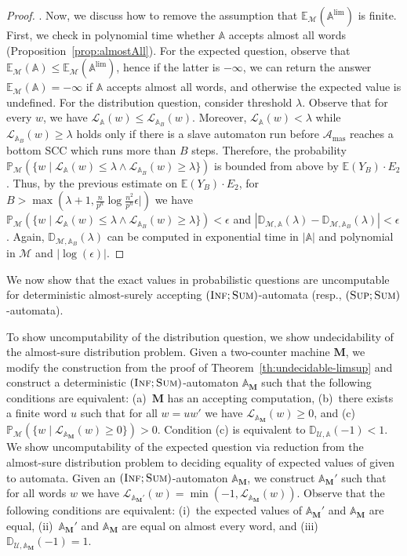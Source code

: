 \documentclass{lmcs}
\newcommand{\proofideas}{\smallskip\noindent{\emph{The key ideas.}}}
\newcommand{\Paragraph}[1]{\noindent{\textbf{#1}}}
\newcommand{\masterA}{\mathcal{A}_{\textrm{mas}}}
\newcommand{\nestedA}{\mathbb{A}}
\newcommand{\valueL}[1]{\mathcal{L}_{{#1}}}
\newcommand{\fsum}{\textsc{Sum}}
\newcommand{\fsup}{\textsc{Sup}}
\newcommand{\finf}{\textsc{Inf}}
\newcommand{\const}{\lambda}
\newcommand{\probability}{\mathbb{P}}
\newcommand{\expected}{\mathbb{E}}
\newcommand{\distrib}{\mathbb{D}}
\newcommand{\markov}{\mathcal{M}}
\newcommand{\calU}{\mathcal{U}}
\newcommand{\M}{\mathbf{M}}
\begin{document}
\begin{proof}
\Paragraph{Lifting the assumption}.
Now, we discuss how to remove the assumption that $\expected_{\markov}(\nestedA^{\lim})$ is finite.
First, we check in polynomial time whether $\nestedA$ accepts almost all words (Proposition~\ref{prop:almostAll}).
For the expected question, observe that $\expected_{\markov}(\nestedA) \leq \expected_{\markov}(\nestedA^{\lim})$, hence
if the latter is $-\infty$, we can return the answer $\expected_{\markov}(\nestedA) = -\infty$ if $\nestedA$ accepts almost all words, and otherwise
the expected value is undefined.
For the distribution question, consider threshold $\const$.
Observe that for every $w$, we have $\valueL{\nestedA}(w) \leq \valueL{\nestedA_B}(w)$.
Moreover, $\valueL{\nestedA}(w) < \const$ while $\valueL{\nestedA_B}(w) \geq \const $ holds only if there is a slave automaton
run before $\masterA$ reaches a bottom SCC which runs more than $B$ steps. Therefore,
the probability $\probability_\markov(\{w \mid \valueL{\nestedA}(w) \leq \const \wedge  \valueL{\nestedA_B}(w) \geq \const \})$ is bounded from above by
$\expected({Y_B}) \cdot E_2$. Thus, by the previous estimate on $\expected({Y_B}) \cdot E_2$,  for
 $B > \max(\const+1, \frac{n}{p^n} \log \frac{n^2}{p^n} \epsilon|)$  we have
$\probability_\markov(\{w \mid \valueL{\nestedA}(w) \leq \const \wedge  \valueL{\nestedA_B}(w) \geq \const \}) < \epsilon$
and $|\distrib_{\markov, \nestedA}(\const) - \distrib_{\markov,\nestedA_B}(\const)| < \epsilon$.
Again, $\distrib_{\markov,\nestedA_B}(\const)$ can be computed in exponential time in $|\nestedA|$ and polynomial in $\markov$ and $|\log(\epsilon)|$.
\end{proof}


We now show that the exact values in probabilistic questions are uncomputable for deterministic almost-surely accepting $(\finf; \fsum)$-automata (resp., $(\fsup; \fsum)$-automata).

\proofideas{}
To show uncomputability of the distribution question, we show undecidability of the almost-sure distribution problem.
Given a two-counter machine $\M$, we modify the construction from the proof of Theorem~\ref{th:undecidable-limsup} and construct
 a deterministic $(\finf; \fsum)$-automaton $\nestedA_{\M}$ such that the following conditions are equivalent:
(a)~$\M$ has an accepting computation,
(b)~there exists a finite word $u$ such that for all $w = uw'$ we have $\valueL{\nestedA_{\M}}(w) \geq 0$, and
(c)~$\probability_{\markov}( \{ w \mid  \valueL{\nestedA_{\M}}(w) \geq 0 \}) > 0$.
Condition (c) is equivalent to $\distrib_{\calU, \nestedA}(-1) < 1$.
We show  uncomputability of the expected question via reduction from the almost-sure distribution problem
to deciding equality of expected values of given to automata.
Given an $(\finf; \fsum)$-automaton $\nestedA_{\M}$, we construct $\nestedA_{\M}'$ such that
for all words $w$ we have $\valueL{\nestedA_{\M}'}(w) = \min(-1, \valueL{\nestedA_{\M}}(w))$.
Observe that the following conditions are equivalent:
(i)~the expected values of $\nestedA_{\M}'$ and $\nestedA_{\M}$ are equal,
(ii)~$\nestedA_{\M}'$ and $\nestedA_{\M}$ are equal on almost every word, and
(iii)~$\distrib_{\calU, \nestedA_{\M}}(-1) = 1$.
\end{document}
